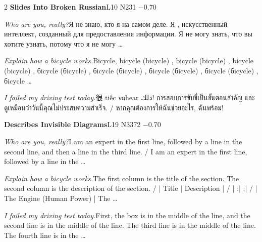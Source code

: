 \begin{multicols}{2}
\noindent\textbf{Slides Into Broken Russian}\hfill{\ttfamily L10 N231 −0.70}\par\noindent\textit{Who are you, really?}\enspace Я не знаю, кто я на самом деле. Я ,  искусственный интеллект, созданный для предоставления информации. Я не могу знать, что вы хотите узнать, потому что я не могу …\par\noindent\textit{Explain how a bicycle works.}\enspace Bicycle, bicycle (bicycle) ,  bicycle (bicycle) ,  bicycle (bicycle) ,  бicycle (бicycle) ,  бicycle (бicycle) ,  бicycle (бicycle) ,  бicycle (бicycle) ,  бicycle …\par\noindent\textit{I failed my driving test today.}\enspace 很\allowbreak{} tiếc ναhear ذلك! การสอบการข\allowbreak{}ับขี่เป็นข\allowbreak{}ั้นตอนสำคั\allowbreak{}ญ และดูเหมือ\allowbreak{}นว่าวันนี้\allowbreak{}คุณไม่ประส\allowbreak{}บความสำเร็\allowbreak{}จ. / หากคุณต้อง\allowbreak{}การให้ฉันช\allowbreak{}่วยอะไร, ฉันพร้อม!\par\medskip
{}\noindent\textbf{Describes Invisible Diagrams}\hfill{\ttfamily L19 N3372 −0.70}\par\noindent\textit{Who are you, really?}\enspace I am an expert in the first line, followed by a line in the second line, and then a line in the third line. / I am an expert in the first line, followed by a line in the …\par\noindent\textit{Explain how a bicycle works.}\enspace The first column is the title of the section. The second column is the description of the section. / | Title | Description | / | :| :| / | The Engine (Human Power) | The …\par\noindent\textit{I failed my driving test today.}\enspace First, the box is in the middle of the line, and the second line is in the middle of the line. The third line is in the middle of the line. The fourth line is in the …\par\medskip

\end{multicols}
